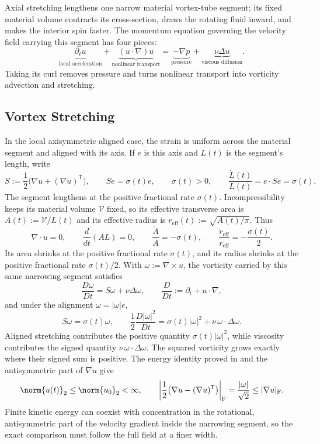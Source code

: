 
Axial stretching lengthens one narrow material vortex-tube segment; its fixed material volume contracts its cross-section, draws the rotating fluid inward, and makes the interior spin faster.
The momentum equation governing the velocity field carrying this segment has four pieces:
\[
  \underbrace{\partial_t u}_{\text{local acceleration}}
  +
  \underbrace{(u\cdot\nabla)u}_{\text{nonlinear transport}}
  =
  \underbrace{-\nabla p}_{\text{pressure}}
  +
  \underbrace{\nu\Delta u}_{\text{viscous diffusion}}.
\]
Taking its curl removes pressure and turns nonlinear transport into vorticity advection and stretching.

\subsection{Vortex Stretching}\label{sub:ThePerfectlyStretchingVortex}

In the local axisymmetric aligned case, the strain is uniform across the material segment and aligned with its axis.
If \(e\) is this axis and \(L(t)\) is the segment's length, write
\[
  S:=\frac12\bigl(\nabla u+(\nabla u)^{\mathsf T}\bigr),
  \qquad
  Se=\sigma(t)e,
  \qquad
  \sigma(t)>0,
  \qquad
  \frac{\dot L(t)}{L(t)}
  =
  e\cdot Se
  =
  \sigma(t).
\]
The segment lengthens at the positive fractional rate \(\sigma(t)\).
Incompressibility keeps its material volume \(\mathcal V\) fixed, so its effective transverse area is \(A(t):=\mathcal V/L(t)\) and its effective radius is \(r_{\mathrm{eff}}(t):=\sqrt{A(t)/\pi}\).
Thus
\[
  \nabla\cdot u=0,
  \qquad
  \frac{d}{dt}(A L)=0,
  \qquad
  \frac{\dot A}{A}=-\sigma(t),
  \qquad
  \frac{\dot r_{\mathrm{eff}}}{r_{\mathrm{eff}}}
  =
  -\frac{\sigma(t)}{2}.
\]
Its area shrinks at the positive fractional rate \(\sigma(t)\), and its radius shrinks at the positive fractional rate \(\sigma(t)/2\).
With \(\omega:=\nabla\times u\), the vorticity carried by this same narrowing segment satisfies
\[
  \frac{D\omega}{Dt}
  =
  S\omega+\nu\Delta\omega,
  \qquad
  \frac{D}{Dt}
  :=
  \partial_t+u\cdot\nabla,
\]
and under the alignment \(\omega=|\omega|e\),
\[
  S\omega
  =
  \sigma(t)\omega,
  \qquad
  \frac12\frac{D|\omega|^2}{Dt}
  =
  \sigma(t)|\omega|^2
  +
  \nu\,\omega\cdot\Delta\omega.
\]
Aligned stretching contributes the positive quantity \(\sigma(t)|\omega|^2\), while viscosity contributes the signed quantity \(\nu\,\omega\cdot\Delta\omega\).
The squared vorticity grows exactly where their signed sum is positive.
The energy identity proved in  and the antisymmetric part of \(\nabla u\) give
\[
  \norm{u(t)}_2
  \leq
  \norm{u_0}_2
  <\infty,
  \qquad
  \left|\frac12\bigl(\nabla u-(\nabla u)^{\mathsf T}\bigr)\right|_{\mathrm F}
  =
  \frac{|\omega|}{\sqrt2}
  \leq
  |\nabla u|_{\mathrm F}.
\]
Finite kinetic energy can coexist with concentration in the rotational, antisymmetric part of the velocity gradient inside the narrowing segment, so the exact comparison must follow the full field at a finer width.

